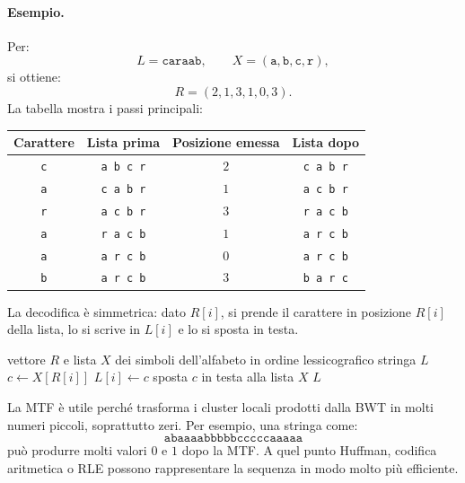 \documentclass{article}
\theoremstyle{definition}
\numberwithin{equation}{section}
\begin{document}
\paragraph{Esempio.}
Per:
\[
    L=\texttt{caraab},
    \qquad
    X=(\texttt{a},\texttt{b},\texttt{c},\texttt{r}),
\]
si ottiene:
\[
    R=(2,1,3,1,0,3).
\]
La tabella mostra i passi principali:
\begin{center}
    \begin{tabular}{|c|c|c|c|}
        \hline
        \textbf{Carattere} & \textbf{Lista prima} & \textbf{Posizione emessa} & \textbf{Lista dopo} \\ \hline
        \texttt{c}         & \texttt{a b c r}     & $2$                       & \texttt{c a b r}    \\ \hline
        \texttt{a}         & \texttt{c a b r}     & $1$                       & \texttt{a c b r}    \\ \hline
        \texttt{r}         & \texttt{a c b r}     & $3$                       & \texttt{r a c b}    \\ \hline
        \texttt{a}         & \texttt{r a c b}     & $1$                       & \texttt{a r c b}    \\ \hline
        \texttt{a}         & \texttt{a r c b}     & $0$                       & \texttt{a r c b}    \\ \hline
        \texttt{b}         & \texttt{a r c b}     & $3$                       & \texttt{b a r c}    \\ \hline
    \end{tabular}
\end{center}

La decodifica è simmetrica: dato $R[i]$, si prende il carattere in posizione $R[i]$ della lista, lo si scrive in $L[i]$ e lo si sposta in testa.

\begin{algorithm}[htpb]
    \caption{}
    \begin{algorithmic}[1]
        \Require vettore $R$ e lista $X$ dei simboli dell'alfabeto in ordine lessicografico
        \Ensure stringa $L$
        \State $c\gets X[R[i]]$
        \State $L[i]\gets c$
        \State sposta $c$ in testa alla lista $X$
        \EndFor
        \State \Return $L$
    \end{algorithmic}
\end{algorithm}

La MTF è utile perché trasforma i cluster locali prodotti dalla BWT in molti numeri piccoli, soprattutto zeri. Per esempio, una stringa come:
\[
    \texttt{abaaaabbbbbcccccaaaaa}
\]
può produrre molti valori $0$ e $1$ dopo la MTF. A quel punto Huffman, codifica aritmetica o RLE possono rappresentare la sequenza in modo molto più efficiente.
\end{document}
